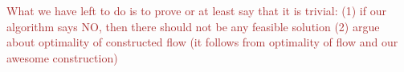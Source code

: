 \documentclass[9pt,twocolumn]{scrartcl}
\newcommand{\Capacity}{\ensuremath{\textsc{cap}}}
\newcommand{\VM}{\textsc{VM}}
\newcommand{\carlo}[1]{\textcolor{red}{#1}}
\newcommand{\maciek}[1]{\textcolor{brown}{#1}}
\newcommand{\MaFactor}{\ensuremath{\textsc{MA}}}
\newcommand{\Source}{\ensuremath{s}}
\newcommand{\Sink}{\ensuremath{t}}
\newcommand{\NodeMapping}{\pi}
\newcommand{\ChunkType}{\ensuremath{textsc{ct}}}
\newcommand{\SubstrateEdges}{\ensuremath{E_S}}
\newcommand{\SubstrateNode}{\ensuremath{v}}
\newcommand{\SubstrateEdge}{\ensuremath{e}}
\newcommand{\Leaf}{\ensuremath{l}}
\newcommand{\Leaves}{\ensuremath{L}}
\newcommand{\Vms}{\ensuremath{n_V}}
\newcommand{\ChunkTypes}{\ensuremath{ch}}
\begin{document}
 \maciek{What we have left to do is to prove or at least say that it is trivial: (1) if our algorithm says NO, then there should not be any feasible solution (2) argue about optimality of constructed flow (it follows from optimality of flow and our awesome construction)}

\end{document}
